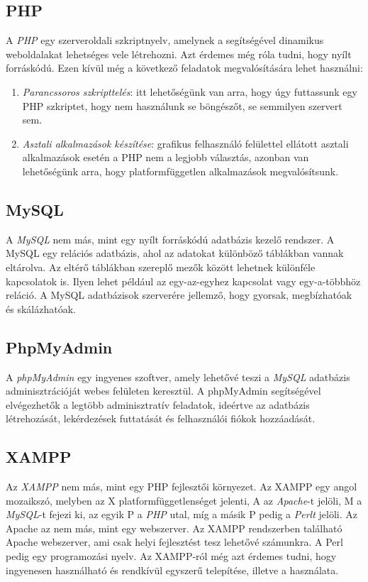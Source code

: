 \documentclass[]{thesis-ekf}
\theoremstyle{definition}
\theoremstyle{remark}
\begin{document}
	\subsection{PHP}
		A \emph{PHP} egy szerveroldali szkriptnyelv, amelynek a segítségével dinamikus weboldalakat lehetséges vele létrehozni. Azt érdemes még róla tudni, hogy nyílt forráskódú. Ezen kívül még a következő feladatok megvalósítására lehet használni:
		\begin{enumerate}
			\item \emph{Parancssoros szkripttelés}: itt lehetőségünk van arra, hogy úgy futtassunk egy PHP szkriptet, hogy nem használunk se böngészőt, se semmilyen szervert sem.
			\item \emph{Asztali alkalmazások készítése}: grafikus felhasználó felülettel ellátott asztali alkalmazások esetén a PHP nem a legjobb választás, azonban van lehetőségünk arra, hogy platformfüggetlen alkalmazások megvalósítsunk.
		\end{enumerate}
		\cite{PHP}
	\subsection{MySQL}
		A \emph{MySQL} nem más, mint egy nyílt forráskódú adatbázis kezelő rendszer. A MySQL egy relációs adatbázis, ahol az adatokat különböző táblákban vannak eltárolva. Az eltérő táblákban szereplő mezők között lehetnek különféle kapcsolatok is. Ilyen lehet például az egy-az-egyhez kapcsolat vagy egy-a-többhöz reláció. A MySQL adatbázisok szerverére jellemző, hogy gyorsak, megbízhatóak és skálázhatóak.
		\cite{MySQL}
	\subsection{PhpMyAdmin}
		A \emph{phpMyAdmin} egy ingyenes szoftver, amely lehetővé teszi a \emph{MySQL} adatbázis adminisztrációját webes felületen keresztül. A phpMyAdmin segítségével elvégezhetők a legtöbb adminisztratív feladatok, ideértve az adatbázis létrehozását, lekérdezések futtatását és felhasználói fiókok hozzáadását. \cite{PhpMyAdmin}
	\subsection{XAMPP}
		Az \emph{XAMPP} nem más, mint egy PHP fejlesztői környezet. Az XAMPP egy angol mozaikszó, melyben az X platformfüggetlenséget jelenti, A az \emph{Apache}-t jelöli, M a \emph{MySQL}-t fejezi ki, az egyik P a \emph{PHP} utal, míg a másik P pedig a \emph{Perlt} jelöli. Az Apache az nem más, mint egy webszerver. Az XAMPP rendszerben található Apache webszerver, ami csak helyi fejlesztést tesz lehetővé számunkra. A Perl pedig egy programozási nyelv. Az XAMPP-ról még azt érdemes tudni, hogy ingyenesen használható és rendkívül egyszerű telepítése, illetve a használata. \cite{XAMPP}
\end{document}
